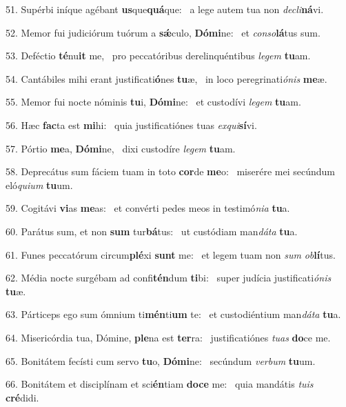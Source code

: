 51. Supérbi iníque agébant \textbf{us}que\textbf{quá}que: \ast\  a lege autem tua non \textit{de}\textit{cli}\textbf{ná}vi.\

52. Memor fui judiciórum tuórum a \textbf{sǽ}culo, \textbf{Dó}\textbf{mi}ne: \ast\  et \textit{con}\textit{so}\textbf{lá}tus sum.\

53. Deféctio \textbf{té}nu\textbf{it} me, \ast\  pro peccatóribus derelinquéntibus \textit{le}\textit{gem} \textbf{tu}am.\

54. Cantábiles mihi erant justificati\textbf{ó}nes \textbf{tu}æ, \ast\  in loco peregrinati\textit{ó}\textit{nis} \textbf{me}æ.\

55. Memor fui nocte nóminis \textbf{tu}i, \textbf{Dó}\textbf{mi}ne: \ast\  et custodívi \textit{le}\textit{gem} \textbf{tu}am.\

56. Hæc \textbf{fac}ta est \textbf{mi}hi: \ast\  quia justificatiónes tuas \textit{ex}\textit{qui}\textbf{sí}vi.\

57. Pórtio \textbf{me}a, \textbf{Dó}\textbf{mi}ne, \ast\  dixi custodíre \textit{le}\textit{gem} \textbf{tu}am.\

58. Deprecátus sum fáciem tuam in toto \textbf{cor}de \textbf{me}o: \ast\  miserére mei secúndum eló\textit{qui}\textit{um} \textbf{tu}um.\

59. Cogitávi \textbf{vi}as \textbf{me}as: \ast\  et convérti pedes meos in testimó\textit{ni}\textit{a} \textbf{tu}a.\

60. Parátus sum, et non \textbf{sum} tur\textbf{bá}tus: \ast\  ut custódiam man\textit{dá}\textit{ta} \textbf{tu}a.\

61. Funes peccatórum circum\textbf{plé}xi \textbf{sunt} me: \ast\  et legem tuam non \textit{sum} \textit{ob}\textbf{lí}tus.\

62. Média nocte surgébam ad confi\textbf{tén}dum \textbf{ti}bi: \ast\  super judícia justificati\textit{ó}\textit{nis} \textbf{tu}æ.\

63. Párticeps ego sum ómnium ti\textbf{mén}ti\textbf{um} te: \ast\  et custodiéntium man\textit{dá}\textit{ta} \textbf{tu}a.\

64. Misericórdia tua, Dómine, \textbf{ple}na est \textbf{ter}ra: \ast\  justificatiónes \textit{tu}\textit{as} \textbf{do}ce me.\

65. Bonitátem fecísti cum servo \textbf{tu}o, \textbf{Dó}\textbf{mi}ne: \ast\  secúndum \textit{ver}\textit{bum} \textbf{tu}um.\

66. Bonitátem et disciplínam et sci\textbf{én}tiam \textbf{do}\textbf{ce} me: \ast\  quia mandátis \textit{tu}\textit{is} \textbf{cré}didi.\

